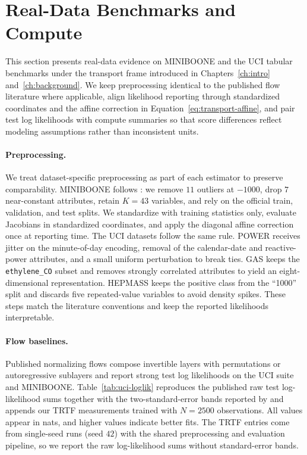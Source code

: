 \documentclass[11pt,a4paper,twoside]{book}\usepackage[]{graphicx}\usepackage[]{xcolor}
\begin{document}
\section{Real-Data Benchmarks and Compute}\label{sec:realdata}

This section presents real-data evidence on MINIBOONE and the UCI tabular benchmarks under the transport frame introduced in Chapters~\ref{ch:intro} and~\ref{ch:background}. We keep preprocessing identical to the published flow literature where applicable, align likelihood reporting through standardized coordinates and the affine correction in Equation~\eqref{eq:transport-affine}, and pair test log likelihoods with compute summaries so that score differences reflect modeling assumptions rather than inconsistent units.

\paragraph{Preprocessing.} We treat dataset-specific preprocessing as part of each estimator to preserve comparability. MINIBOONE follows \citet{papamakarios2017masked}: we remove $11$ outliers at $-1000$, drop $7$ near-constant attributes, retain $K=43$ variables, and rely on the official train, validation, and test splits. We standardize with training statistics only, evaluate Jacobians in standardized coordinates, and apply the diagonal affine correction once at reporting time. The UCI datasets follow the same rule. POWER receives jitter on the minute-of-day encoding, removal of the calendar-date and reactive-power attributes, and a small uniform perturbation to break ties. GAS keeps the \texttt{ethylene\_CO} subset and removes strongly correlated attributes to yield an eight-dimensional representation. HEPMASS keeps the positive class from the ``1000'' split and discards five repeated-value variables to avoid density spikes. These steps match the literature conventions and keep the reported likelihoods interpretable.

\paragraph{Flow baselines.} Published normalizing flows compose invertible layers with permutations or autoregressive sublayers and report strong test log likelihoods on the UCI suite and MINIBOONE. Table~\ref{tab:uci-loglik} reproduces the published raw test log-likelihood sums together with the two-standard-error bands reported by \citet{papamakarios2017masked} and appends our TRTF measurements trained with $N=2500$ observations. All values appear in nats, and higher values indicate better fits. The TRTF entries come from single-seed runs (seed $42$) with the shared preprocessing and evaluation pipeline, so we report the raw log-likelihood sums without standard-error bands.
\end{document}
